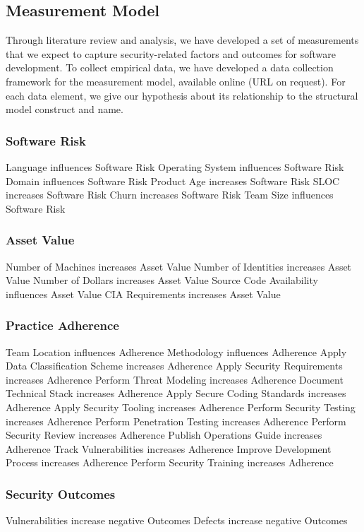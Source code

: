

\subsection{Measurement Model}
\label{sec:model_measurement}
Through literature review and analysis, we have developed a set of measurements that we expect to capture security-related factors and outcomes for software development. To collect empirical data, we have developed a data collection framework for the measurement model, available online (URL on request). For each data element, we give our hypothesis about its relationship to the structural model construct  and name. 

\subsubsection{Software Risk}

	Language	influences	Software Risk	
	Operating System	influences	Software Risk	
	Domain	influences	Software Risk	
	Product Age	increases	Software Risk	
	SLOC	increases	Software Risk	
	Churn	increases	Software Risk	
	Team Size	influences	Software Risk	

\subsubsection{Asset Value}

	Number of Machines	increases	Asset Value
	Number of Identities	increases	Asset Value	
	Number of Dollars	increases	Asset Value	
	Source Code Availability	influences	Asset Value
	CIA Requirements	increases	Asset Value

\subsubsection{Practice Adherence}

Team Location	influences	Adherence	
Methodology	influences	Adherence	
Apply Data Classification Scheme increases	Adherence	
Apply Security Requirements		increases		Adherence
Perform Threat Modeling	increases	Adherence	
Document Technical Stack	increases	Adherence	
Apply Secure Coding Standards	increases	Adherence	
Apply Security Tooling	increases	Adherence
Perform Security Testing	increases	Adherence	
Perform Penetration Testing	increases	Adherence	
Perform Security Review	increases	Adherence	
Publish Operations Guide	increases	Adherence
Track Vulnerabilities	increases	Adherence	
Improve Development Process	increases	Adherence	
Perform Security Training	increases	Adherence	

\subsubsection{Security Outcomes}
Vulnerabilities	increase negative	Outcomes
Defects increase negative Outcomes




